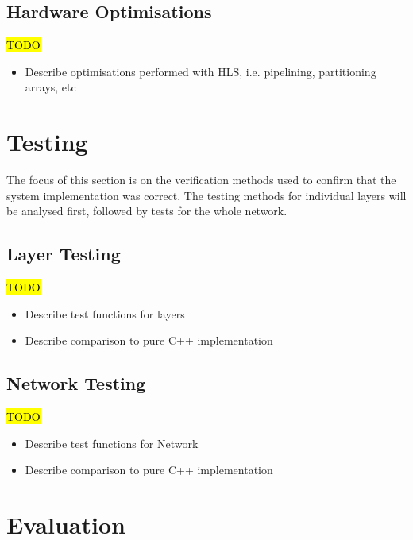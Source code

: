 \documentclass[12pt]{article}
\begin{document}
\subsection{Hardware Optimisations}
\label{sec:Imp-Optimisations}


\hl{TODO}

\begin{itemize}
\item Describe optimisations performed with HLS, i.e. pipelining, partitioning arrays, etc
\end{itemize}

\newpage

\section{Testing}
\label{sec:Test}


The focus of this section is on the verification methods used to confirm that the system implementation was correct. The testing methods for individual layers will be analysed first, followed by tests for the whole network.

\subsection{Layer Testing}
\label{sec:Test-Layers}


\hl{TODO}

\begin{itemize}
\item Describe test functions for layers
\item Describe comparison to pure C++ implementation
\end{itemize}

\subsection{Network Testing}
\label{sec:Test-Network}


\hl{TODO}

\begin{itemize}
\item Describe test functions for Network
\item Describe comparison to pure C++ implementation
\end{itemize}

\newpage

\section{Evaluation}
\label{sec:Eval}
\end{document}
